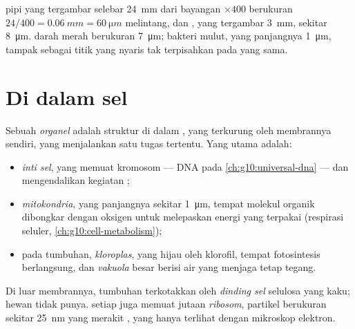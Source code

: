 \begin{example}\label{ex:g10:cells-common-unit:cheek}
 pipi yang tergambar selebar \qty{24}{mm} dari bayangan $\times 400$
berukuran $24/400 = \qty{0.06}{mm} = \qty{60}{\micro m}$ melintang, dan
, yang tergambar \qty{3}{mm}, sekitar \qty{8}{\micro m}. 
darah merah berukuran \qty{7}{\micro m}; bakteri mulut, yang panjangnya
\qty{1}{\micro m}, tampak sebagai titik yang nyaris tak terpisahkan
pada  yang sama.
\end{example}

\section{Di dalam sel}

\begin{definition}[Organel]\label{def:g10:cells-common-unit:organelle}
Sebuah \emph{organel} adalah struktur di dalam , yang
terkurung oleh membrannya sendiri, yang menjalankan satu tugas
tertentu. Yang utama adalah:
\begin{itemize}
  \item \emph{inti sel}, yang memuat
        kromosom --- DNA pada \cref{ch:g10:universal-dna} --- dan
        mengendalikan kegiatan ;
  \item \emph{mitokondria}, yang panjangnya sekitar
        \qty{1}{\micro m}, tempat molekul organik dibongkar
        dengan oksigen untuk melepaskan energi yang terpakai (respirasi
        seluler, \cref{ch:g10:cell-metabolism});
  \item pada  tumbuhan, \emph{kloroplas},
        yang hijau oleh klorofil, tempat fotosintesis berlangsung, dan
        \emph{vakuola} besar berisi air yang menjaga
         tetap tegang.
\end{itemize}
Di luar membrannya,  tumbuhan terkotakkan oleh
\emph{dinding sel} selulosa yang kaku;  hewan
tidak punya.  setiap  juga memuat jutaan
\emph{ribosom}, partikel berukuran sekitar \qty{25}{nm}
yang merakit , yang hanya terlihat dengan mikroskop elektron.
\end{definition}

